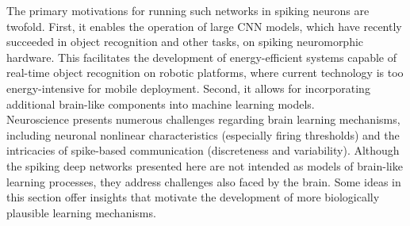 
\noindent The primary motivations for running such networks in spiking neurons are twofold. First, it enables the operation of large CNN models, which have recently succeeded in object recognition and other tasks, on spiking neuromorphic hardware. This facilitates the development of energy-efficient systems capable of real-time object recognition on robotic platforms, where current technology is too energy-intensive for mobile deployment. Second, it allows for incorporating additional brain-like components into machine learning models. \\

\noindent Neuroscience presents numerous challenges regarding brain learning mechanisms, including neuronal nonlinear characteristics (especially firing thresholds) and the intricacies of spike-based communication (discreteness and variability). Although the spiking deep networks presented here are not intended as models of brain-like learning processes, they address challenges also faced by the brain. Some ideas in this section offer insights that motivate the development of more biologically plausible learning mechanisms.\\



